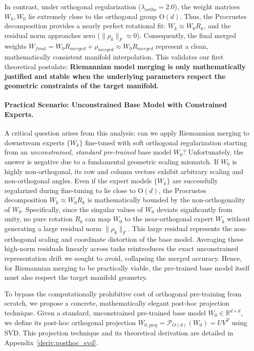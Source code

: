 In contrast, under orthogonal regularization ($\lambda_{ortho} = 2.0$), the weight matrices $W_k, W_0$ lie extremely close to the orthogonal group $\mathrm{O}(d)$. Thus, the Procrustes decomposition provides a nearly perfect rotational fit: $W_k \approx W_0 R_k$, and the residual norm approaches zero ($\|\rho_k\|_F \approx 0$). Consequently, the final merged weights $W_{final} = W_0 R_{merged} + \rho_{merged} \approx W_0 R_{merged}$ represent a clean, mathematically consistent manifold interpolation. This validates our first theoretical postulate: \textbf{Riemannian model merging is only mathematically justified and stable when the underlying parameters respect the geometric constraints of the target manifold.}

\paragraph{Practical Scenario: Unconstrained Base Model with Constrained Experts.}
A critical question arises from this analysis: can we apply Riemannian merging to downstream experts $\{W_k\}$ fine-tuned with soft orthogonal regularization starting from an \emph{unconstrained, standard pre-trained} base model $W_0$? 
Unfortunately, the answer is negative due to a fundamental geometric scaling mismatch. If $W_0$ is highly non-orthogonal, its row and column vectors exhibit arbitrary scaling and non-orthogonal angles. Even if the expert models $\{W_k\}$ are successfully regularized during fine-tuning to lie close to $\mathrm{O}(d)$, the Procrustes decomposition $W_k \approx W_0 R_k$ is mathematically bounded by the non-orthogonality of $W_0$. Specifically, since the singular values of $W_0$ deviate significantly from unity, no pure rotation $R_k$ can map $W_0$ to the near-orthogonal expert $W_k$ without generating a large residual norm $\|\rho_k\|_F$.
This large residual represents the non-orthogonal scaling and coordinate distortion of the base model. Averaging these high-norm residuals linearly across tasks reintroduces the exact unconstrained representation drift we sought to avoid, collapsing the merged accuracy. Hence, for Riemannian merging to be practically viable, the pre-trained base model itself must also respect the target manifold geometry. 

To bypass the computationally prohibitive cost of orthogonal pre-training from scratch, we propose a concrete, mathematically elegant post-hoc projection technique. Given a standard, unconstrained pre-trained base model $W_0 \in \mathbb{R}^{d \times d}$, we define its post-hoc orthogonal projection $W_{0,\text{proj}} = \mathcal{P}_{\mathrm{O}(d)}(W_0) = U V^T$ using SVD. This projection technique and its theoretical derivation are detailed in Appendix~\ref{deriv:posthoc_svd}.

